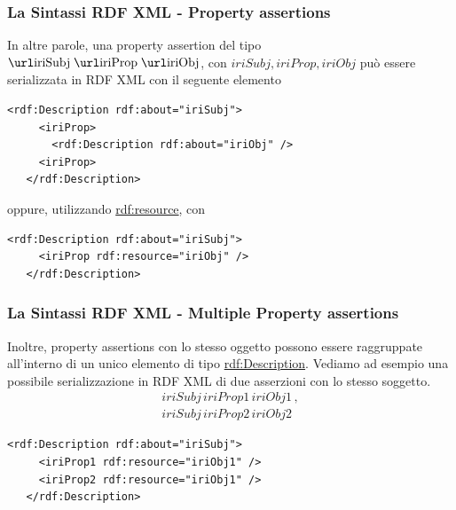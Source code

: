 \documentclass[8pt]{beamer}
\begin{document}
\begin{frame}[fragile]
 \frametitle{La Sintassi RDF XML - Property assertions}
 In altre parole, una property assertion del tipo $\tripleO{iriSubj}{iriProp}{iriObj}$,
 con $iriSubj, iriProp, iriObj$ pu\`o essere serializzata in RDF XML 
 con il seguente elemento 

 \begin{Verbatim}[fontsize=\small]
   <rdf:Description rdf:about="iriSubj">
     <iriProp>
       <rdf:Description rdf:about="iriObj" />
     <iriProp>      
   </rdf:Description>
\end{Verbatim}

oppure, utilizzando \url{rdf:resource}, con

\begin{Verbatim}[fontsize=\small]
   <rdf:Description rdf:about="iriSubj">
     <iriProp rdf:resource="iriObj" />
   </rdf:Description>
\end{Verbatim}
\end{frame}

\begin{frame}[fragile]
 \frametitle{La Sintassi RDF XML - Multiple Property assertions}
 
 
 Inoltre, property assertions con lo stesso oggetto possono essere 
 raggruppate all'interno di un unico elemento di tipo \url{rdf:Description}.
 Vediamo ad esempio una possibile serializzazione in RDF XML di due asserzioni 
 con lo stesso soggetto.
\[
\begin{array}{l}
 iriSubj\,iriProp1\,iriObj1 \,, \\
 iriSubj\,iriProp2\,iriObj2
\end{array}
\]

\begin{Verbatim}[fontsize=\small]
   <rdf:Description rdf:about="iriSubj">
     <iriProp1 rdf:resource="iriObj1" />
     <iriProp2 rdf:resource="iriObj1" />
   </rdf:Description>
\end{Verbatim}
\end{frame}

% 
% 
% 
\end{document}
